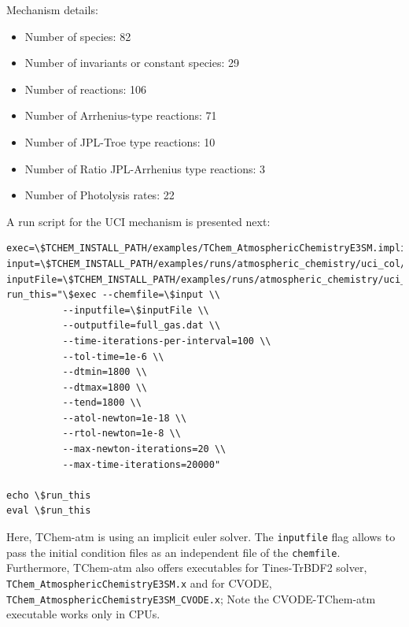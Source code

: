 \documentclass[report, 12pt]{SANDreport}
\begin{document}
Mechanism details:

\begin{itemize}
    \item Number of species: 82
    \item Number of invariants or constant species: 29
    \item Number of reactions: 106
    \item Number of Arrhenius-type reactions: 71
    \item Number of JPL-Troe type reactions: 10
    \item Number of Ratio JPL-Arrhenius type reactions: 3
    \item Number of Photolysis rates: 22
\end{itemize}


A run script for the UCI mechanism is presented next:

\begin{verbatim}
exec=\$TCHEM_INSTALL_PATH/examples/TChem_AtmosphericChemistryE3SM.implicit_euler.x
input=\$TCHEM_INSTALL_PATH/examples/runs/atmospheric_chemistry/uci_col/uci_v2_test3.yaml
inputFile=\$TCHEM_INSTALL_PATH/examples/runs/atmospheric_chemistry/uci_col/input_conditions_multi_col.yaml
run_this="\$exec --chemfile=\$input \\
          --inputfile=\$inputFile \\
          --outputfile=full_gas.dat \\
          --time-iterations-per-interval=100 \\
          --tol-time=1e-6 \\
          --dtmin=1800 \\
          --dtmax=1800 \\
          --tend=1800 \\
          --atol-newton=1e-18 \\
          --rtol-newton=1e-8 \\
          --max-newton-iterations=20 \\
          --max-time-iterations=20000"

echo \$run_this
eval \$run_this
\end{verbatim}


Here, TChem-atm is using an implicit euler solver. The \verb|inputfile| flag allows to pass the initial condition files as an independent file of the \verb|chemfile|. Furthermore, TChem-atm also offers executables for Tines-TrBDF2 solver, \verb|TChem_AtmosphericChemistryE3SM.x| and for CVODE, \verb|TChem_AtmosphericChemistryE3SM_CVODE.x|; Note the CVODE-TChem-atm executable works only in CPUs.
\end{document}
